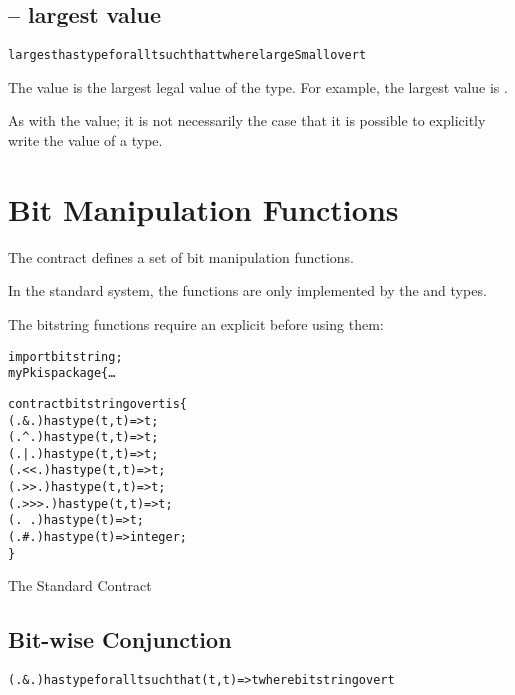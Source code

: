 \subsection{ -- largest value}
\begin{alltt}
largest has type for all t such that t where largeSmall over t
\end{alltt}

The   value is the largest legal value of the type. For example, the largest  value is .

\begin{aside}
As with the  value; it is not necessarily the case that it is possible to explicitly write the  value of a type.
\end{aside}

\section{Bit Manipulation Functions}
\label{bitString}

The  contract defines a set of bit manipulation functions.

\begin{aside}
In the standard system, the  functions are only implemented by the  and  types.
\end{aside}

\begin{aside}
The bitstring functions require an explicit  before using them:
\begin{alltt}
import bitstring;
myPk is package \{ \ldots
\end{alltt}
\end{aside}

\begin{program}
\begin{alltt}
contract bitstring over t is \{
    (.&.) has type (t,t)=>t;
    (.^.) has type (t,t)=>t;
    (.|.) has type (t,t)=>t;
    (.<<.) has type (t,t)=>t;
    (.>>.) has type (t,t)=>t;
    (.>>>.) has type (t,t)=>t;
    (.~.) has type (t)=>t;
    (.#.) has type (t)=>integer;
\}
\end{alltt}
\caption{The Standard  Contract\label{bitstringContractDef}}
\end{program}

\subsection{ Bit-wise Conjunction}
\label{bitAnd}
\begin{alltt}
(.&.) has type for all t such that (t,t)=>t where bitstring over t
\end{alltt}

